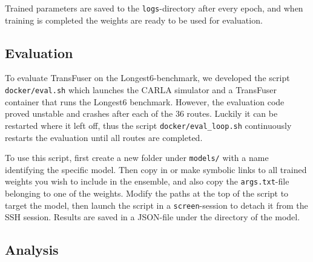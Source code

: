 Trained parameters are saved to the \texttt{logs}-directory after every epoch,
and when training is completed the weights are ready to be used for evaluation.

\subsection{Evaluation}

To evaluate TransFuser on the Longest6-benchmark,
we developed the script \texttt{docker/eval.sh}
which launches the CARLA simulator and a TransFuser container that runs the Longest6 benchmark.
However, the evaluation code proved unstable and crashes after each of the 36 routes.
Luckily it can be restarted where it left off,
thus the script \texttt{docker/eval\_loop.sh}
continuously restarts the evaluation until all routes are completed.

To use this script,
first create a new folder under \texttt{models/} with a name identifying the specific model.
Then copy in or make symbolic links to all trained weights you wish to include in the ensemble,
and also copy the \texttt{args.txt}-file belonging to one of the weights.
Modify the paths at the top of the script to target the model,
then launch the script in a \texttt{screen}-session to detach it from the SSH session.
Results are saved in a JSON-file under the directory of the model.

\subsection{Analysis}

